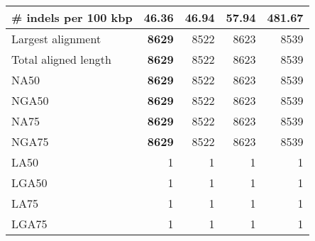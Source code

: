 \documentclass[12pt,a4paper]{article}
\begin{document}
\begin{table}[ht]
\begin{center}
\begin{tabular}{|l*{4}{|r}|}
\# indels per 100 kbp & {\bf 46.36} & 46.94 & 57.94 & 481.67 \\ \hline
Largest alignment & {\bf 8629} & 8522 & 8623 & 8539 \\ \hline
Total aligned length & {\bf 8629} & 8522 & 8623 & 8539 \\ \hline
NA50 & {\bf 8629} & 8522 & 8623 & 8539 \\ \hline
NGA50 & {\bf 8629} & 8522 & 8623 & 8539 \\ \hline
NA75 & {\bf 8629} & 8522 & 8623 & 8539 \\ \hline
NGA75 & {\bf 8629} & 8522 & 8623 & 8539 \\ \hline
LA50 & 1 & 1 & 1 & 1 \\ \hline
LGA50 & 1 & 1 & 1 & 1 \\ \hline
LA75 & 1 & 1 & 1 & 1 \\ \hline
LGA75 & 1 & 1 & 1 & 1 \\ \hline
\end{tabular}
\end{center}
\end{table}
\end{document}
